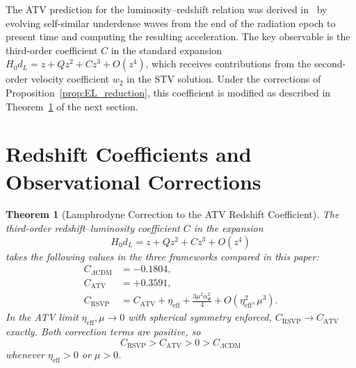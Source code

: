 \documentclass[12pt,a4paper]{article}
\theoremstyle{plain}
\newtheorem{theorem}{Theorem}[section]
\theoremstyle{definition}
\theoremstyle{remark}
\newcommand{\etaeff}{\eta_{\mathrm{eff}}}
\begin{document}
The ATV prediction for the luminosity--redshift relation was derived in~\cite{STV2017,ATV2026}
by evolving self-similar underdense waves from the end of the radiation epoch to present
time and computing the resulting acceleration. The key observable is the third-order
coefficient $C$ in the standard expansion $H_0 d_L = z + Qz^2 + Cz^3 + O(z^4)$,
which receives contributions from the second-order velocity coefficient $w_2$ in the
STV solution. Under the corrections of Proposition~\ref{prop:EL_reduction}, this
coefficient is modified as described in Theorem~\ref{thm:D} of the next section.

\section{Redshift Coefficients and Observational Corrections}
\label{sec:redshift}

\begin{theorem}[Lamphrodyne Correction to the ATV Redshift Coefficient]
\label{thm:D}
The third-order redshift--luminosity coefficient $C$ in the expansion
\begin{equation}
  H_0 d_L = z + Qz^2 + Cz^3 + O(z^4)
  \label{eq:HL_expansion}
\end{equation}
takes the following values in the three frameworks compared in this paper:
\begin{align}
  C_{\Lambda\mathrm{CDM}} &= -0.1804,
  \label{eq:C_LCDM} \\
  C_{\mathrm{ATV}} &= +0.3591,
  \label{eq:C_ATV} \\
  C_{\mathrm{RSVP}}
  &= C_{\mathrm{ATV}}
     + \etaeff
     + \frac{3\mu^2\alpha_\Phi^2}{4}
     + O(\etaeff^2,\mu^3).
  \label{eq:C_RSVP_base}
\end{align}
In the ATV limit $\etaeff,\mu\to 0$ with spherical symmetry enforced,
$C_{\mathrm{RSVP}}\to C_{\mathrm{ATV}}$ exactly. Both correction terms are
positive, so
\begin{equation}
  C_{\mathrm{RSVP}} > C_{\mathrm{ATV}} > 0 > C_{\Lambda\mathrm{CDM}}
  \label{eq:C_ordering}
\end{equation}
whenever $\etaeff > 0$ or $\mu > 0$.
\end{theorem}
\end{document}
